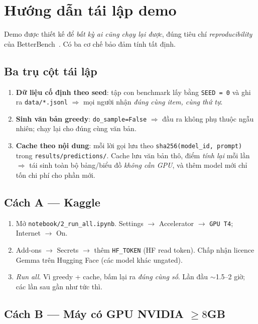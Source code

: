\section{Hướng dẫn tái lập demo}
\label{sec:repro}

Demo được thiết kế để \emph{bất kỳ ai cũng chạy lại được}, đúng tiêu chí
\emph{reproducibility} của BetterBench~\cite{betterbench}. Có ba cơ chế
bảo đảm tính tất định.

\subsection{Ba trụ cột tái lập}

\begin{enumerate}
  \item \textbf{Dữ liệu cố định theo seed}: tập con benchmark lấy bằng
    \texttt{SEED = 0} và ghi ra \texttt{data/*.jsonl} $\Rightarrow$ mọi người nhận
    \emph{đúng cùng item, cùng thứ tự}.
  \item \textbf{Sinh văn bản greedy}: \texttt{do\_sample=False} $\Rightarrow$ đầu
    ra không phụ thuộc ngẫu nhiên; chạy lại cho đúng cùng văn bản.
  \item \textbf{Cache theo nội dung}: mỗi lời gọi lưu theo
    \texttt{sha256(model\_id, prompt)} trong \texttt{results/predictions/}. Cache
    lưu văn bản thô, điểm \emph{tính lại} mỗi lần $\Rightarrow$ tái sinh toàn bộ
    bảng/biểu đồ \emph{không cần GPU}, và thêm model mới chỉ tốn chi phí cho phần
    mới.
\end{enumerate}

\subsection{Cách A --- Kaggle}

\begin{enumerate}
  \item Mở \texttt{notebook/2\_run\_all.ipynb}. Settings $\to$ Accelerator
    $\to$ \texttt{GPU T4}; Internet $\to$ On.
  \item Add-ons $\to$ Secrets $\to$ thêm \texttt{HF\_TOKEN} (HF read token). Chấp
    nhận licence Gemma trên Hugging Face (các model khác ungated).
  \item \emph{Run all}. Vì greedy + cache, bấm lại ra \emph{đúng cùng số}. Lần đầu
    $\sim$1.5--2 giờ; các lần sau gần như tức thì.
\end{enumerate}

\subsection{Cách B --- Máy có GPU NVIDIA $\geq 8$GB}

